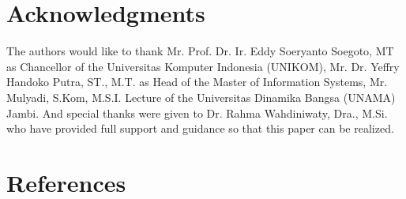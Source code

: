 \documentclass[12pt,a4paper,final]{iopart}
\begin{document}
\section*{Acknowledgments}
The authors would like to thank Mr. Prof. Dr. Ir. Eddy Soeryanto Soegoto, MT as Chancellor of the Universitas Komputer Indonesia (UNIKOM), Mr. Dr. Yeffry Handoko Putra, ST., M.T. as Head of the Master of Information Systems, Mr. Mulyadi, S.Kom, M.S.I. Lecture of the Universitas Dinamika Bangsa (UNAMA) Jambi. And special thanks were given to Dr. Rahma Wahdiniwaty, Dra., M.Si. who have provided full support and guidance so that this paper can be realized. 


\section*{References}




\end{document}
